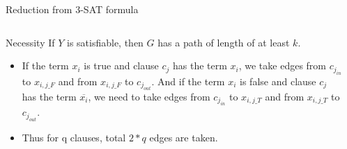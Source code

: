 \begin{frame}{Reduction from 3-SAT formula}
\begin{columns}
\begin{column}{0.45\textwidth}
\begin{block}{Necessity}
If $Y$ is satisfiable, then $G$ has a path of length of at least $k$.
\end{block}

  \begin{itemize} 
    \item<1->If the term $x_i$ is true
     and clause $c_j$ has the term $x_i$, we take edges from $c_{j_{in}}$ to 
        $x_{i,j\_F}$  %
        and from $x_{i,j\_F}$ to $c_{j_{out}}$. And if the term $x_i$ is false and clause $c_j$ has the term $\overline{x_i}$, we need to take edges from $c_{j_{in}}$ to $x_{i,j\_T}$ and from $x_{i,j\_T}$ to $c_{j_{out}}$. 
        \item<2->
        Thus for q clauses, total $2*q$ edges are taken.

\end{itemize}
\end{column}
\begin{column}{0.55\textwidth}
    \begin{overlayarea}{0.55\textwidth}{8cm}
    \end{overlayarea}
\end{column}
\end{columns}
\end{frame}

